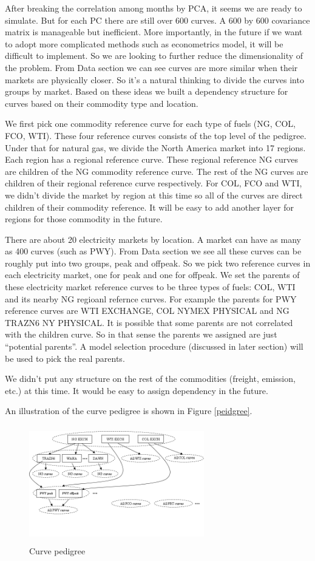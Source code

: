 \documentclass[12pt]{article}
\begin{document}
After breaking the correlation among months by PCA, it seems we are ready 
to simulate. But for each PC there are still over 600 curves.
A 600 by 600 covariance matrix is manageable but inefficient.
More importantly, in the future if we want to adopt more complicated 
methods such as econometrics model, it will be difficult to implement.
So we are looking to further reduce the dimensionality of the problem.
From Data section we can see curves are more similar when their
markets are physically closer. So it's a natural thinking to 
divide the curves into groups by market. Based on these ideas
we built a dependency structure for curves based on 
their commodity type and location. 

We first pick one commodity reference curve for each type of fuels
(NG, COL, FCO, WTI). These four reference curves consists of the
top level of the pedigree. Under that
for natural gas, we divide the North America market into 17 
regions. Each region has a regional reference curve. 
These regional reference NG curves are children of the 
NG commodity reference curve. The rest of the NG curves
are children of their regional reference curve respectively.
For COL, FCO and WTI, we didn't divide the market by region 
at this time so all of the curves are direct 
children of their commodity reference. It will be easy to
add another layer for regions for those commodity 
in the future.  

There are about 20 electricity markets by location. 
A market can have as many as 400 curves (such as PWY). 
From Data section we see all these curves can be roughly 
put into two groups, peak and offpeak. So we pick 
two reference curves in each electricity market,
one for peak and one for offpeak.
We set the parents of these electricity market reference
curves to be three types of fuels: COL, WTI and its nearby
NG regioanl refernce curves. For example the parents 
for PWY reference curves are WTI EXCHANGE, COL NYMEX PHYSICAL
and  NG TRAZN6 NY PHYSICAL. It is possible that
some parents are not correlated with the children curve.
So in that sense the parents we assigned are just ``potential
parents''. A model selection procedure (discussed in later section)
will be used to pick the real parents.

We didn't put any structure on the rest of the commodities 
(freight, emission, etc.) at this time. It would be easy
to assign dependency in the future. 

An illustration of the curve pedigree is shown in Figure 
\ref{peidgree}.
\begin{figure}[htbp]
\centering
\includegraphics[width=3in, height=2in]{figures/pedigree.png}
\caption{Curve pedigree}
\label{pedigree}
\end{figure}
\end{document}
